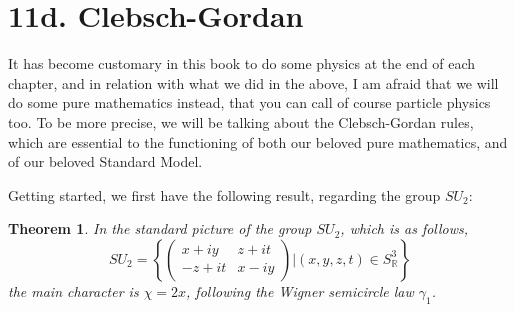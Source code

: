 \documentclass[12pt]{amsbook}
\newtheorem{theorem}{Theorem}[chapter]
\begin{document}
\section*{11d. Clebsch-Gordan}

It has become customary in this book to do some physics at the end of each chapter, and in relation with what we did in the above, I am afraid that we will do some pure mathematics instead, that you can call of course particle physics too. To be more precise, we will be talking about the Clebsch-Gordan rules, which are essential to the functioning of both our beloved pure mathematics, and of our beloved Standard Model.

\bigskip

Getting started, we first have the following result, regarding the group $SU_2$:

\begin{theorem}
In the standard picture of the group $SU_2$, which is as follows,
$$SU_2=\left\{\begin{pmatrix}x+iy&z+it\\ -z+it&x-iy\end{pmatrix}\Big|(x,y,z,t)\in S^3_\mathbb R\right\}$$ 
the main character is $\chi=2x$, following the Wigner semicircle law $\gamma_1$.
\end{theorem}
\end{document}
